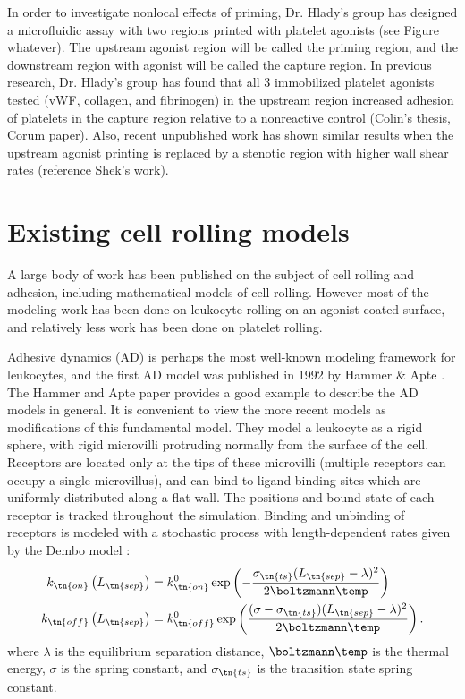 In order to investigate nonlocal effects of priming, Dr. Hlady's group
has designed a microfluidic assay with two regions printed with
platelet agonists (see Figure whatever). The upstream agonist region
will be called the priming region, and the downstream region with
agonist will be called the capture region. In previous research,
Dr. Hlady's group has found that all 3 immobilized platelet agonists
tested (vWF, collagen, and fibrinogen) in the upstream region
increased adhesion of platelets in the capture region relative to a
nonreactive control (Colin's thesis, Corum paper). Also, recent
unpublished work has shown similar results when the upstream agonist
printing is replaced by a stenotic region with higher wall shear rates
(reference Shek's work).

\section{Existing cell rolling models}
\label{sec:exist-cell-roll}

A large body of work has been published on the subject of cell rolling
and adhesion, including mathematical models of cell rolling. However
most of the modeling work has been done on leukocyte rolling on an
agonist-coated surface, and relatively less work has been done on
platelet rolling.

Adhesive dynamics (AD) is perhaps the most well-known modeling
framework for leukocytes, and the first AD model was published in 1992
by Hammer \& Apte \cite{Hammer1992}. The Hammer and Apte paper
provides a good example to describe the AD models in general. It is
convenient to view the more recent models as modifications of this
fundamental model. They model a leukocyte as a rigid sphere, with
rigid microvilli protruding normally from the surface of the
cell. Receptors are located only at the tips of these microvilli
(multiple receptors can occupy a single microvillus), and can bind to
ligand binding sites which are uniformly distributed along a flat
wall. The positions and bound state of each receptor is tracked
throughout the simulation. Binding and unbinding of receptors is
modeled with a stochastic process with length-dependent rates given by
the Dembo model \cite{Dembo1988}:
\begin{align}
  \label{eq:dembo-on}
  k_\tn{on} \left(L_\tn{sep}\right)
  &= k_\tn{on}^0 \exp \left( -\frac{\sigma_\tn{ts} (L_\tn{sep} -
    \lambda)^2}{2\boltzmann \temp} \right) \\
  \label{eq:dembo-off}
  k_\tn{off} \left(L_\tn{sep}\right)
  &= k_\tn{off}^0 \exp \left( \frac{(\sigma - \sigma_\tn{ts})
    (L_\tn{sep} - \lambda)^2}{2 \boltzmann \temp} \right).
\end{align}
where $\lambda$ is the equilibrium separation distance,
$\boltzmann\temp$ is the thermal energy, $\sigma$ is the spring
constant, and $\sigma_\tn{ts}$ is the transition state spring
constant.


